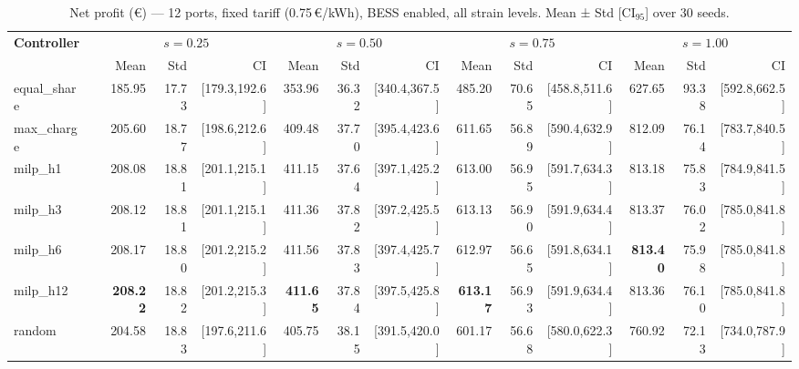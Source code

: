 \begin{table}[!htb]
\centering
\caption{Net profit (€) — 12 ports, fixed tariff (0.75\,€/kWh), BESS enabled,
         all strain levels. Mean ± Std [CI$_{95}$] over 30 seeds.}
\label{tab:gc_12port_fixed}
\setlength{\tabcolsep}{3pt}
\begin{tabular}{lp{1cm} rrr rrr rrr rrr}
\toprule
\textbf{Controller} & &
  \multicolumn{3}{c}{$s=0.25$} &
  \multicolumn{3}{c}{$s=0.50$} &
  \multicolumn{3}{c}{$s=0.75$} &
  \multicolumn{3}{c}{$s=1.00$} \\
\cmidrule(lr){3-5}\cmidrule(lr){6-8}\cmidrule(lr){9-11}\cmidrule(lr){12-14}
 & & Mean & Std & CI & Mean & Std & CI & Mean & Std & CI & Mean & Std & CI \\
\midrule
equal\_share & & 185.95 & 17.73 & [179.3,192.6] & 353.96 & 36.32 & [340.4,367.5] & 485.20 & 70.65 & [458.8,511.6] & 627.65 & 93.38 & [592.8,662.5] \\
max\_charge  & & 205.60 & 18.77 & [198.6,212.6] & 409.48 & 37.70 & [395.4,423.6] & 611.65 & 56.89 & [590.4,632.9] & 812.09 & 76.14 & [783.7,840.5] \\
milp\_h1     & & 208.08 & 18.81 & [201.1,215.1] & 411.15 & 37.64 & [397.1,425.2] & 613.00 & 56.95 & [591.7,634.3] & 813.18 & 75.83 & [784.9,841.5] \\
milp\_h3     & & 208.12 & 18.81 & [201.1,215.1] & 411.36 & 37.82 & [397.2,425.5] & 613.13 & 56.90 & [591.9,634.4] & 813.37 & 76.02 & [785.0,841.8] \\
milp\_h6     & & 208.17 & 18.80 & [201.2,215.2] & 411.56 & 37.83 & [397.4,425.7] & 612.97 & 56.65 & [591.8,634.1] & \textbf{813.40} & 75.98 & [785.0,841.8] \\
milp\_h12    & & \textbf{208.22} & 18.82 & [201.2,215.3] & \textbf{411.65} & 37.84 & [397.5,425.8] & \textbf{613.17} & 56.93 & [591.9,634.4] & 813.36 & 76.10 & [785.0,841.8] \\
random       & & 204.58 & 18.83 & [197.6,211.6] & 405.75 & 38.15 & [391.5,420.0] & 601.17 & 56.68 & [580.0,622.3] & 760.92 & 72.13 & [734.0,787.9] \\
\bottomrule
\end{tabular}
\end{table}

